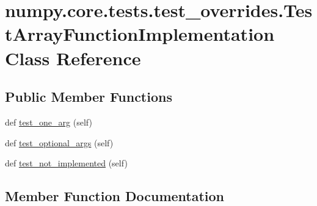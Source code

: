 \hypertarget{classnumpy_1_1core_1_1tests_1_1test__overrides_1_1TestArrayFunctionImplementation}{}\section{numpy.\+core.\+tests.\+test\+\_\+overrides.\+Test\+Array\+Function\+Implementation Class Reference}
\label{classnumpy_1_1core_1_1tests_1_1test__overrides_1_1TestArrayFunctionImplementation}
\subsection*{Public Member Functions}
\begin{DoxyCompactItemize}
\item 
def \hyperlink{classnumpy_1_1core_1_1tests_1_1test__overrides_1_1TestArrayFunctionImplementation_ab09131a7cd0a5ff53129dd8680fc776f}{test\+\_\+one\+\_\+arg} (self)
\item 
def \hyperlink{classnumpy_1_1core_1_1tests_1_1test__overrides_1_1TestArrayFunctionImplementation_ad04242467ee59b5cb70117fbcef881fb}{test\+\_\+optional\+\_\+args} (self)
\item 
def \hyperlink{classnumpy_1_1core_1_1tests_1_1test__overrides_1_1TestArrayFunctionImplementation_ad3506a1690e8ab21ecf53ecf93a97734}{test\+\_\+not\+\_\+implemented} (self)
\end{DoxyCompactItemize}


\subsection{Member Function Documentation}
\mbox{\label{classnumpy_1_1core_1_1tests_1_1test__overrides_1_1TestArrayFunctionImplementation_ad3506a1690e8ab21ecf53ecf93a97734}} 
